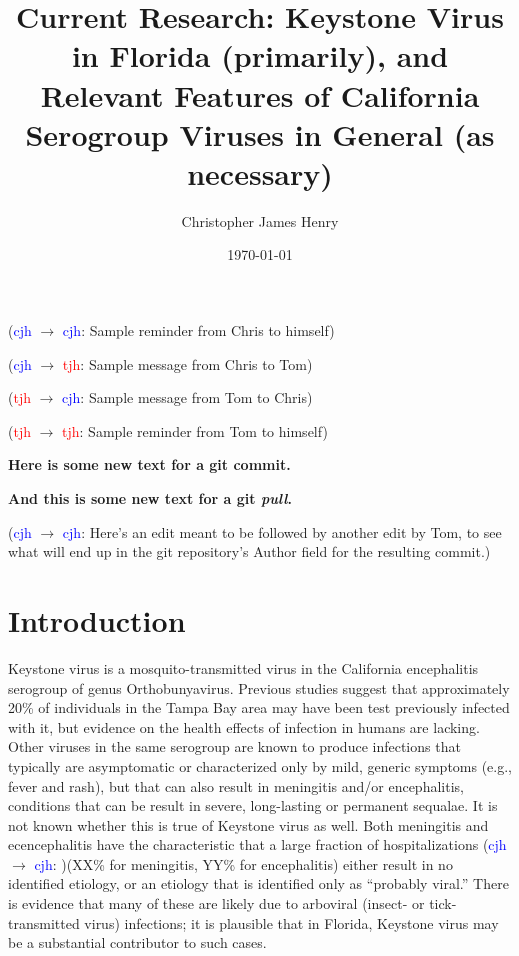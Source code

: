 \documentclass{article}
\title%
{Current Research: Keystone Virus in Florida (primarily), and Relevant Features of California Serogroup Viruses in General (as necessary)}
\author%
{Christopher James Henry}
\date{\today}
\newcommand{\cjh}{\textcolor{blue}{cjh}}
\newcommand{\tjh}{\textcolor{red}{tjh}}
\newcommand{\msg}[3]{(#1 $\rightarrow$ #2: #3)}
\newcommand{\mcc}[1]{\msg\cjh\cjh{#1}}
\newcommand{\mct}[1]{\msg\cjh\tjh{#1}}
\newcommand{\mtc}[1]{\msg\tjh\cjh{#1}}
\newcommand{\mtt}[1]{\msg\tjh\tjh{#1}}
\begin{document}
    \titlepage
    
    \mcc{Sample reminder from Chris to himself} 

    \mct{Sample message from Chris to Tom} 

    \mtc{Sample message from Tom to Chris} 

    \mtt{Sample reminder from Tom to himself} 


    \textbf{Here is some new text for a git commit.}
    
    \textbf{And this is some new text for a git \textit{pull}.}
    
    \mcc{Here's an edit meant to be followed by another edit by Tom, to see what will end up in the git repository's Author field for the resulting commit.}

    \section{Introduction}
        Keystone virus is a mosquito-transmitted virus in the California encephalitis serogroup of genus Orthobunyavirus. Previous studies suggest that approximately 20\% of individuals in the Tampa Bay area may have been test previously infected with it, but evidence on the health effects of infection in humans are lacking. Other viruses in the same serogroup are known to produce infections that typically are asymptomatic or characterized only by mild, generic symptoms (e.g., fever and rash), but that can also result in meningitis and/or encephalitis, conditions that can be result in severe, long-lasting or permanent sequalae. It is not known whether this is true of Keystone virus as well. Both meningitis and ecencephalitis have the characteristic that a large fraction of hospitalizations \mcc{}(XX\% for meningitis, YY\% for encephalitis) either result in no identified etiology, or an etiology that is identified only as ``probably viral.'' There is evidence that many of these are likely due to arboviral (insect- or tick-transmitted virus) infections; it is plausible that in Florida, Keystone virus may be a substantial contributor to such cases.
\end{document}
